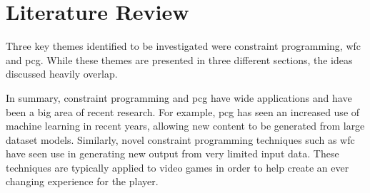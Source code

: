 \chapter{Literature Review}





Three key themes identified to be investigated were constraint programming, \acrlong{wfc} and \acrlong{pcg}. While these themes are presented in three different sections, the ideas discussed heavily overlap.

In summary, constraint programming and \acrlong{pcg} have wide applications and have been a big area of recent research. For example, \acrlong{pcg} has seen an increased use of machine learning in recent years, allowing new content to be generated from large dataset models. Similarly, novel constraint programming techniques such as \acrlong{wfc} have seen use in generating new output from very limited input data. These techniques are typically applied to video games in order to help create an ever changing experience for the player.

